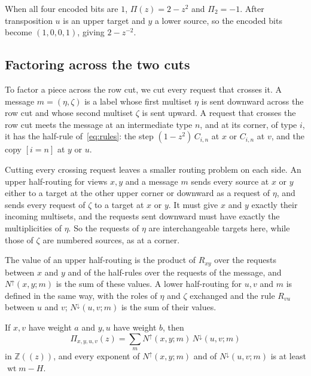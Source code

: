 \documentclass[11pt]{article}
\theoremstyle{definition}
\theoremstyle{definition}
\theoremstyle{remark}
\newcommand{\Z}{\mathbb{Z}}
\newcommand{\wt}{\operatorname{wt}}
\newcommand{\Nup}{N^{\uparrow}}
\newcommand{\Ndown}{N^{\downarrow}}
\begin{document}
When all four encoded bits are $1$, $\Pi(z)=2-z^2$ and $\Pi_2=-1$. After transposition $u$ is an upper target and $y$ a lower source, so the encoded bits become $(1,0,0,1)$, giving $2-z^{-2}$.

\subsection{Factoring across the two cuts}

To factor a piece across the row cut, we cut every request that crosses it. A message $m=(\eta,\zeta)$ is a label whose first multiset $\eta$ is sent downward across the row cut and whose second multiset $\zeta$ is sent upward. A request that crosses the row cut meets the message at an intermediate type $n$, and at its corner, of type $i$, it has the half-rule of~\eqref{eq:rules}: the step $(1-z^2)\,C_{i,n}$ at $x$ or $C_{i,n}$ at $v$, and the copy $[i=n]$ at $y$ or $u$.

Cutting every crossing request leaves a smaller routing problem on each side. An upper half-routing for views $x,y$ and a message $m$ sends every source at $x$ or $y$ either to a target at the other upper corner or downward as a request of $\eta$, and sends every request of $\zeta$ to a target at $x$ or $y$. It must give $x$ and $y$ exactly their incoming multisets, and the requests sent downward must have exactly the multiplicities of $\eta$. So the requests of $\eta$ are interchangeable targets here, while those of $\zeta$ are numbered sources, as at a corner.

The value of an upper half-routing is the product of $R_{xy}$ over the requests between $x$ and $y$ and of the half-rules over the requests of the message, and $\Nup(x,y;m)$ is the sum of these values. A lower half-routing for $u,v$ and $m$ is defined in the same way, with the roles of $\eta$ and $\zeta$ exchanged and the rule $R_{vu}$ between $u$ and $v$; $\Ndown(u,v;m)$ is the sum of their values.

\begin{lemma}\label{lem:rowcut}
If $x,v$ have weight $a$ and $y,u$ have weight $b$, then
\[
\Pi_{x,y,u,v}(z)=\sum_m\Nup(x,y;m)\,\Ndown(u,v;m)
\]
in $\Z((z))$, and every exponent of $\Nup(x,y;m)$ and of $\Ndown(u,v;m)$ is at least $\wt m-H$.
\end{lemma}
\end{document}
